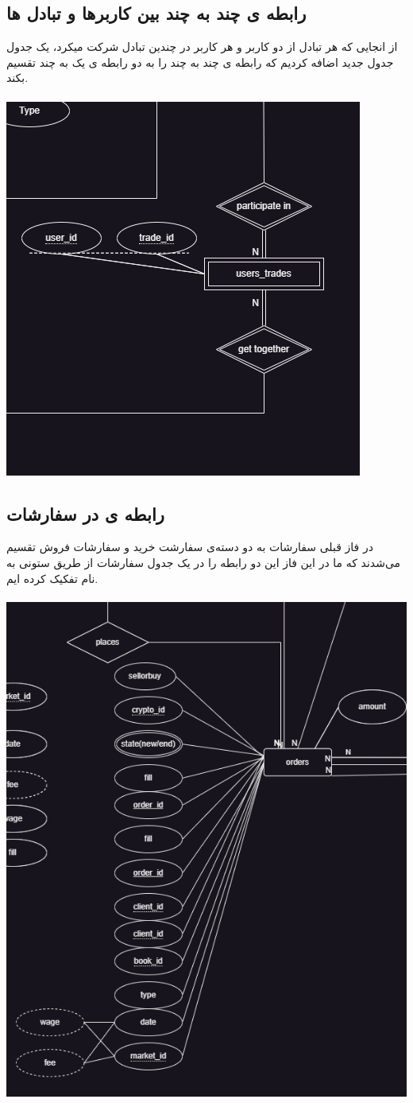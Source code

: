 \documentclass{book}
\begin{document}
\subsection{رابطه ی چند به چند بین کاربرها و تبادل ها}
از انجایی که هر تبادل از دو کاربر و هر کاربر در چندین تبادل شرکت میکرد، یک جدول جدول جدید اضافه کردیم که رابطه ی چند به چند را به دو رابطه ی یک به چند تقسیم بکند.
\\ \\
\includegraphics[width=0.8\linewidth]{users_trades.png}
\newpage

\subsection{رابطه ی  در سفارشات}
در فاز قبلی سفارشات به دو دسته‌ی سفارشت خرید و سفارشات فروش تقسیم می‌شدند که ما در این فاز این دو رابطه را در یک جدول سفارشات از طریق ستونی به نام  تفکیک کرده ایم.
\\ \\
\includegraphics[width=0.8\linewidth]{orders.png}
\newpage
\end{document}
